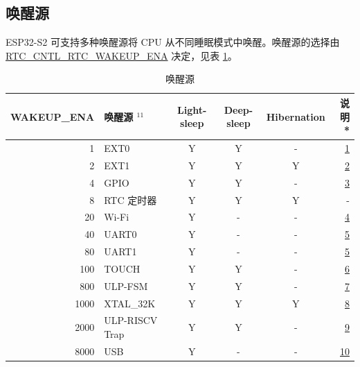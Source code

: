 \documentclass[main\_\_CN.tex]{subfiles}
\begin{document}
\subsection{唤醒源}\label{WakeupSource}

ESP32-S2 可支持多种唤醒源将 CPU 从不同睡眠模式中唤醒。唤醒源的选择由 \hyperref[fielddesc:RTCCNTLRTCWAKEUPENA]{RTC\_CNTL\_RTC\_WAKEUP\_ENA} 决定，见表 \ref{table:wakeup source}。

\begin{table}[H]
\centering
\caption{唤醒源}
\label{table:wakeup source}
\begin{tabular}[h]{ | r | l | c | c | c | r | }
\hline
\rowcolor{lightgray}
WAKEUP\_ENA & 唤醒源 \hyperlink{wakeup-sources-note1}{$^{11}$}&  Light-sleep & Deep-sleep & Hibernation & 说明* \\
\hline
\hexprefix{}1 & EXT0 & Y & Y & - & \hyperlink{wakeup-sources-note1}{1} \\
\hline
\hexprefix{}2 & EXT1 & Y & Y & Y & \hyperlink{wakeup-sources-note2}{2} \\
\hline
\hexprefix{}4 & GPIO & Y & Y & - & \hyperlink{wakeup-sources-note3}{3} \\
\hline
\hexprefix{}8 & RTC 定时器 & Y & Y & Y & -\\
\hline
\hexprefix{}20 & Wi-Fi & Y & - & - & \hyperlink{wakeup-sources-note5}{4} \\
\hline
\hexprefix{}40 & UART0 & Y & - & - & \hyperlink{wakeup-sources-note6}{5} \\
\hline
\hexprefix{}80 & UART1 & Y & - & - & \hyperlink{wakeup-sources-note6}{5} \\
\hline
\hexprefix{}100 & TOUCH & Y & Y & - &  \hyperlink{wakeup-sources-note7}{6}\\
\hline
\hexprefix{}800 & ULP-FSM & Y & Y & -  & \hyperlink{wakeup-sources-note8}{7} \\
\hline
\hexprefix{}1000 & XTAL\_32K & Y & Y & Y  & \hyperlink{wakeup-sources-note9}{8} \\
\hline
\hexprefix{}2000 & ULP-RISCV Trap & Y & Y & -  & \hyperlink{wakeup-sources-note10}{9} \\
\hline
\hexprefix{}8000 & USB & Y & - & - & \hyperlink{wakeup-sources-note11}{10} \\
\hline
\end{tabular}
\end{table}
\end{document}
